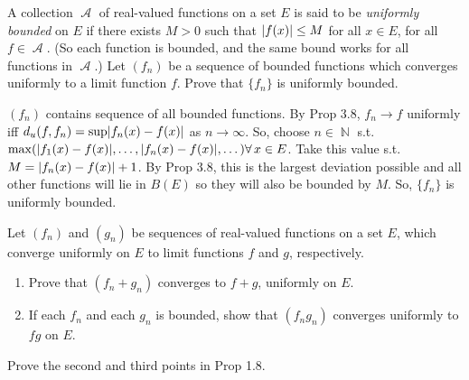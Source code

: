 \documentclass[12pt,letterpaper,boxed]{hmcpset}
\DeclareMathOperator{\A}{\mathcal{A}}
\DeclareMathOperator{\N}{\mathbb{N}}
\DeclarePairedDelimiter\abs{\lvert}{\rvert}%
\begin{document}

\begin{problem}[Exercise 3.9]
A collection $\A$ of real-valued functions on a set $E$ is said to be \textit{uniformly bounded} on $E$ if there exists $M > 0$ such that $\abs{f(x)} \leq M$ for all $x \in E$, for all $f\in\A.$ (So each function is bounded, and the same bound works for all functions in $\A$.) Let $(f_n)$ be a sequence of bounded functions which converges uniformly to a limit function $f$. Prove that $\{f_n\}$ is uniformly bounded.
\end{problem}

\begin{solution}
$(f_n)$ contains sequence of all bounded functions. By Prop 3.8, $f_n \rightarrow f$ uniformly iff $d_u(f, f_n) = \sup \abs{f_n(x) - f(x)}$ as $n\rightarrow\infty$. So, choose $n\in\N$ s.t. $\max(\abs{f_1(x) - f(x)}, \dots, \abs{f_n(x) - f(x)}, \dots) \forall \, x \in E$. Take this value s.t. $M = \abs{f_n(x) - f(x)} + 1$. By Prop 3.8, this is the largest deviation possible and all other functions will lie in $B(E)$ so they will also be bounded by $M$. So, $\{f_n\}$ is uniformly bounded.
\end{solution}

\begin{problem}[Exercise 3.10]
Let $(f_n)$ and $(g_n)$ be sequences of real-valued functions on a set $E$, which converge uniformly on $E$ to limit functions $f$ and $g$, respectively.
\begin{enumerate}
    \item Prove that $(f_n + g_n)$ converges to $f + g$, uniformly on $E$.
    \item If each $f_n$ and each $g_n$ is bounded, show that $(f_n g_n)$ converges uniformly to $fg$ on $E$.
\end{enumerate} 
\end{problem}

\begin{solution}

\end{solution}

\begin{problem}[Exercise 1.9]
Prove the second and third points in Prop 1.8.
\end{problem}

\begin{solution}

\end{solution}
\end{document}
